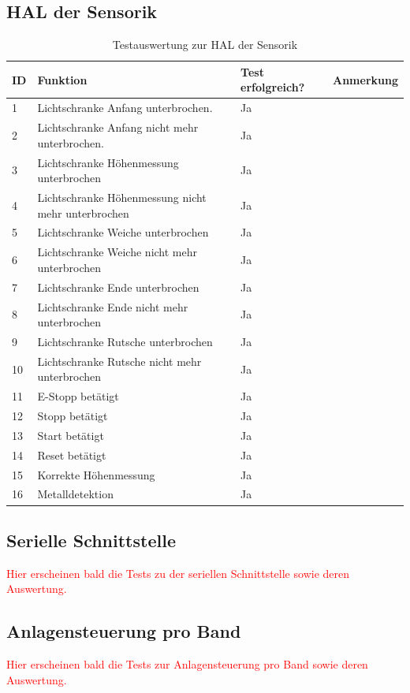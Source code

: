 \documentclass[a4paper, 11pt]{article}
\begin{document}
\subsection{HAL der Sensorik}
\begin{table}[h]
\center
\begin{tabularx}{\textwidth}{|l|X|X|X|}
\hline
\textbf{ID}&\textbf{Funktion}&\textbf{Test erfolgreich?}&\textbf{Anmerkung}\\
\hline
1&Lichtschranke Anfang unterbrochen.&Ja&\\
\hline
2&Lichtschranke Anfang nicht mehr unterbrochen.&Ja&\\
\hline
3&Lichtschranke Höhenmessung unterbrochen&Ja&\\
\hline
4&Lichtschranke Höhenmessung nicht mehr unterbrochen&Ja&\\
\hline
5&Lichtschranke Weiche unterbrochen&Ja&\\
\hline
6&Lichtschranke Weiche nicht mehr unterbrochen&Ja&\\
\hline
7&Lichtschranke Ende unterbrochen&Ja&\\
\hline
8&Lichtschranke Ende nicht mehr unterbrochen&Ja&\\
\hline
9&Lichtschranke Rutsche unterbrochen&Ja&\\
\hline
10&Lichtschranke Rutsche nicht mehr unterbrochen&Ja&\\
\hline
11&E-Stopp betätigt&Ja&\\
\hline
12&Stopp betätigt&Ja&\\
\hline
13&Start betätigt&Ja&\\
\hline
14&Reset betätigt&Ja&\\
\hline
15&Korrekte Höhenmessung&Ja&\\
\hline
16&Metalldetektion&Ja&\\
\hline
\end{tabularx}
\caption{Testauswertung zur HAL der Sensorik}
\label{tstsens}
\end{table}

\newpage

\subsection{Serielle Schnittstelle}
\textcolor{red}{Hier erscheinen bald die Tests zu der seriellen Schnittstelle sowie deren Auswertung.}

\subsection{Anlagensteuerung pro Band}
\textcolor{red}{Hier erscheinen bald die Tests zur Anlagensteuerung pro Band sowie deren Auswertung.}
\end{document}
